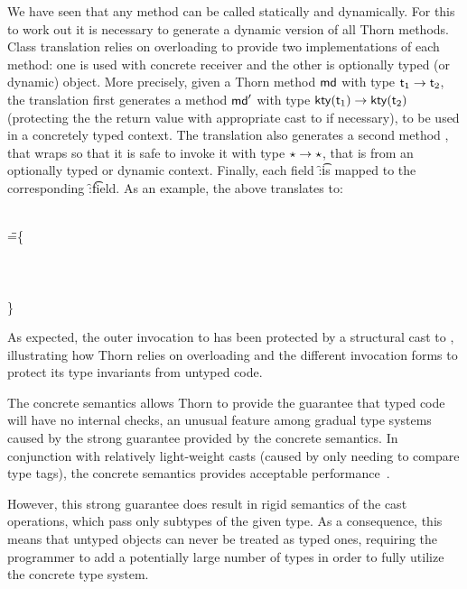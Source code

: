 \documentclass{tex/llncs}
\begin{document}
We have seen that any method can be called statically and dynamically. For
this to work out it is necessary to generate a dynamic version of all Thorn
methods.  Class translation relies on overloading to provide two
implementations of each method: one is used with concrete receiver
and the other is
optionally typed (or dynamic) object.  More precisely, given a Thorn method
\(\md\) with type \(\t[1] \to \t[2]\), the \kafka translation first
generates a method \(\mdp\) with type \(\kty{\t[1]} \to \kty{\t[2]}\)
(protecting the the return value with appropriate cast to \kty{\t[2]} if
necessary), to be used in a concretely typed context.  The \kafka
translation also generates a second method \mdpp, that wraps \mdp so that it
is safe to invoke it with type \(\star \to \star\), that is from an optionally
typed or dynamic context.  Finally, each field \f:\t is mapped to the
corresponding \f:\kty\t field.  As an example, the above translates to:

\begin{tabbing}
  \HS
  \KCall{\New \A{}}\n{\SubCast\C{(\KCall{\New\A{}}\m{\SubCast\any{\New\C{}}}\any\any)}}\C\C\
  \\ \HS\HS\HS\HS\HS\HS\HS\HS\HS\HS\HS\HS\HS\HS\HS\HS\HS\HS\HS\HS
\WHERE\HS \K=\HS\=
 \class\= \A \{\\
\>\HS    \Mdef \m\x\any \any{~\x~}\\
\>\HS    \Mdef \n\x\C\C{~\x~}\\
\>\HS    \Mdef \n\x\any\any {\SubCast\any{\KCall\this\n{\SubCast\C\x}\C\C }} \\
\>\}
 \end{tabbing}
\medskip

\noindent As expected, the outer invocation to \n has been protected by a
structural cast to \C, illustrating how Thorn relies on overloading and the
different invocation forms to protect its type invariants from untyped code.

The concrete semantics allows Thorn to provide the guarantee that typed code
will have no internal checks, an unusual feature among gradual type systems
caused by the strong guarantee provided by the concrete semantics. In
conjunction with relatively light-weight casts (caused by only needing to
compare type tags), the concrete semantics provides acceptable performance~\cite{oopsla09}. 

However, this strong guarantee does result in rigid semantics of the cast
operations, which pass only subtypes of the given type. As a consequence, this
means that untyped objects can never be treated as typed ones, requiring the 
programmer to add a potentially large number of types in order to fully utilize
the concrete type system.
\end{document}

